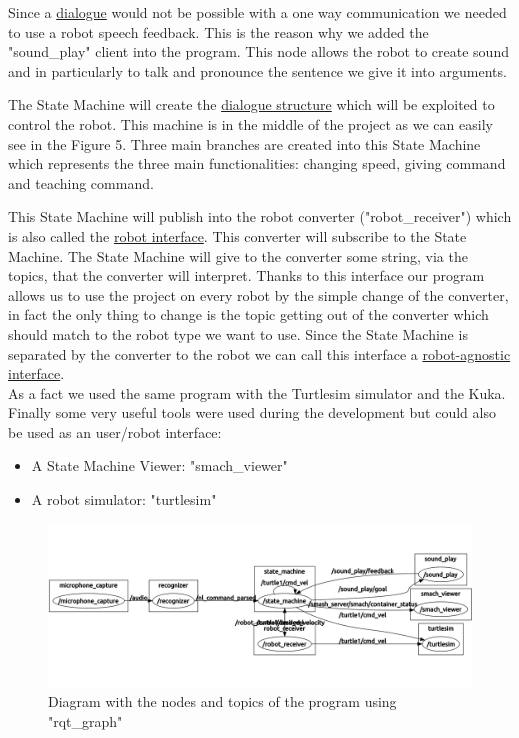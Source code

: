Since a \underline{dialogue} would not be possible with a one way communication we needed to use a robot speech feedback. This is the reason why we added the "sound\_play" client into the program. This node allows the robot to create sound and in particularly to talk and pronounce the sentence we give it into arguments. 

The State Machine will create the \underline{dialogue structure} which will be exploited to control the robot. This machine is in the middle of the project as we can easily see in the Figure 5. Three main branches are created into this State Machine which represents the three main functionalities: changing speed, giving command and teaching command. 

This State Machine will publish into the robot converter ("robot\_receiver") which is also called the \underline{robot interface}. This converter will subscribe to the State Machine. The State Machine will give to the converter some string, via the topics, that the converter will interpret. Thanks to this interface our program allows us to use the project on every robot by the simple change of the converter, in fact the only thing to change is the topic getting out of the converter which should match to the robot type we want to use. Since the State Machine is separated by the converter to the robot we can call this interface a \underline{robot-agnostic interface}.\hfill \linebreak
\\
As a fact we used the same program with the Turtlesim simulator and the Kuka.\hfill \linebreak
\\
Finally some very useful tools were used during the development but could also be used as an user/robot interface: 
\begin{itemize}
  \item A State Machine Viewer: "smach\_viewer"
  \item A robot simulator: "turtlesim" 
\end{itemize}

\begin{figure}
\center
\includegraphics[width=16cm]{img_SM/rqt_graph_ALL_FINAL.png}
\caption{Diagram with the nodes and topics of the program using "rqt\_graph"}
\end{figure}

